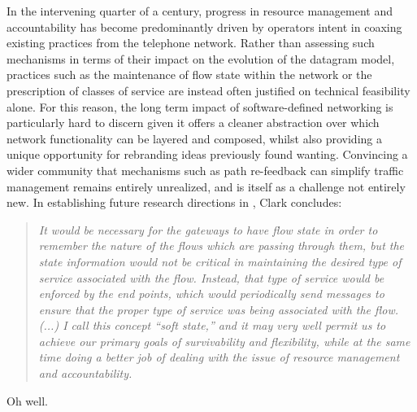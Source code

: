 In the intervening quarter of a century, progress in resource management and accountability has become predominantly driven by operators intent in coaxing existing practices from the telephone network.
Rather than assessing such mechanisms in terms of their impact on the evolution of the datagram model, practices such as the maintenance of flow state within the network or the prescription of classes of service are instead often justified on technical feasibility alone.
For this reason, the long term impact of software-defined networking is particularly hard to discern given it offers a cleaner abstraction over which network functionality can be layered and composed, whilst also providing a unique opportunity for rebranding ideas previously found wanting.
Convincing a wider community that mechanisms such as path re-feedback can simplify traffic management remains entirely unrealized, and is itself as a challenge not entirely new.
In establishing future research directions in \cite{Clark:1988p478}, Clark concludes:

\begin{quote}
\textit{
It would be necessary for the gateways to have flow state in order to remember the nature of the flows which are passing through them, but the state information would not be critical in maintaining the desired type of service associated with the flow. Instead, that type of service would be enforced by the end points, which would periodically send messages to ensure that the proper type of service was being associated with the flow.
(...)
I call this concept ``soft state,'' and it may very well permit us to achieve our primary goals of survivability and flexibility, while at the same time doing a better job of dealing with the issue of resource management and accountability.
}
\end{quote}

Oh well.


